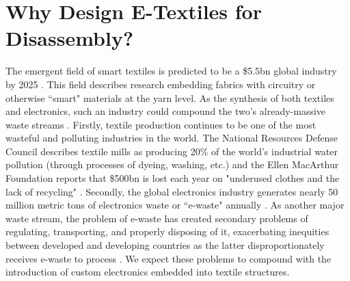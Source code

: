 
\section{Why Design E-Textiles for Disassembly?}

The emergent field of smart textiles is predicted to be a \$5.5bn global industry by 2025 \cite{research_global_2019}. This field describes research embedding fabrics with circuitry or otherwise ``smart" materials at the yarn level. As the synthesis of both textiles and electronics, such an industry could compound the two's already-massive waste streams \cite{noauthor_smart_2012, circular_fashion,WEARSustain_network}. Firstly, textile production continues to be one of the most wasteful and polluting industries in the world. The National Resources Defense Council describes textile mills as producing 20\% of the world's industrial water pollution (through processes of dyeing, washing, etc.) \cite{noauthor_encourage_nodate} and the Ellen MacArthur Foundation reports that \$500bn is lost each year on "underused clothes and the lack of recycling" \cite{circular_fashion}. Secondly, the global electronics industry generates nearly 50 million metric tons of electronics waste or ``e-waste" annually \cite{rifat_breaking_2019}. As another major waste stream, the problem of e-waste has created secondary problems of regulating, transporting, and properly disposing of it, exacerbating inequities between developed and developing countries as the latter disproportionately receives e-waste to process \cite{Zhang:2011:DAU:2347504.2347511, raghavan_means_2017}. We expect these problems to compound with the introduction of custom electronics embedded into textile structures.

